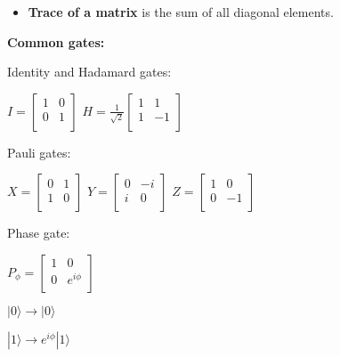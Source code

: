 \documentclass{article}
\begin{document}
\begin{itemize}
	\item \textbf{Trace of a matrix} is the sum of all diagonal elements.
\end{itemize}

\newpage

\textbf{Common gates:}

Identity and Hadamard gates:
\begin{center}
$
  I =
  \left[ {\begin{array}{cc}
    1 & 0 \\
    0 & 1 \\
  \end{array} } \right]
$
\quad
$
  H = \frac{1}{\sqrt{2}} \left[ {\begin{array}{cc}
    1 & 1 \\
    1 & -1 \\
  \end{array} } \right]
$
\end{center}

Pauli gates:
\begin{center}
$
  X = \left[ {\begin{array}{cc}
    0 & 1 \\
    1 & 0 \\
  \end{array} } \right]
$
\quad
$
 Y = \left[ {\begin{array}{cc}
    0 & -i \\
    i & 0 \\
  \end{array} } \right]
$
\quad
$
  Z = \left[ {\begin{array}{cc}
    1 & 0 \\
    0 & -1 \\
  \end{array} } \right]
$
\end{center}

Phase gate:
\begin{multicols}{2}
$ P_{\phi} = \left[ {\begin{array}{cc}
    1 & 0 \\
    0 & e^{i\phi} \\
  \end{array} } \right]$

\columnbreak

$ |0\rangle \rightarrow |0\rangle$

$ |1\rangle \rightarrow e^{i\phi} |1\rangle$
\end{multicols}
\end{document}
